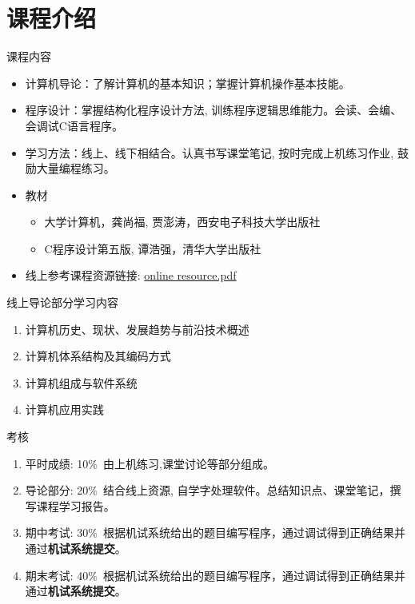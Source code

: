 
\section{课程介绍}

\begin{frame}[shrink]{课程内容}
\begin{itemize}
	\item 计算机导论：了解计算机的基本知识；掌握计算机操作基本技能。
	\item 程序设计：掌握结构化程序设计方法, 训练程序逻辑思维能力。会读、会编、会调试C语言程序。
	\item 学习方法：线上、线下相结合。认真书写课堂笔记, 按时完成上机练习作业, 鼓励大量编程练习。
	\item 教材
	\begin{itemize}
		\item 大学计算机，龚尚福, 贾澎涛，西安电子科技大学出版社
		\item C程序设计第五版, 谭浩强，清华大学出版社
	\end{itemize}
	\item 线上参考课程资源链接:
	\href{./online resource.pdf}{online resource.pdf} %
\end{itemize}
\end{frame}

\begin{frame}{线上导论部分学习内容}
\begin{enumerate}
	\setlength{\itemsep}{.8cm}
	\item 计算机历史、现状、发展趋势与前沿技术概述
	\item 计算机体系结构及其编码方式
	\item 计算机组成与软件系统
	\item 计算机应用实践
\end{enumerate}
\end{frame}

\begin{frame}{考核}
\begin{enumerate}
	\setlength{\itemsep}{.5cm}
	\item 平时成绩: 10\%~由上机练习,课堂讨论等部分组成。
	\item 导论部分: 20\%~结合线上资源, 自学字处理软件。总结知识点、课堂笔记，撰写课程学习报告。
	\item 期中考试: 30\%~根据机试系统给出的题目编写程序，通过调试得到正确结果并通过\textbf{机试系统提交}。
	\item 期末考试: 40\%~根据机试系统给出的题目编写程序，通过调试得到正确结果并通过\textbf{机试系统提交}。
\end{enumerate}
\end{frame}

